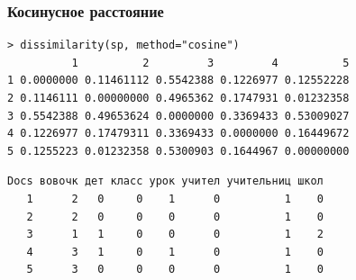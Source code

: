 \documentclass[svgnames]{beamer}
\begin{document}
\begin{frame}[fragile]
  \frametitle{Косинусное расстояние}

  \footnotesize
\begin{verbatim}
> dissimilarity(sp, method="cosine")
          1          2         3         4          5
1 0.0000000 0.11461112 0.5542388 0.1226977 0.12552228
2 0.1146111 0.00000000 0.4965362 0.1747931 0.01232358
3 0.5542388 0.49653624 0.0000000 0.3369433 0.53009027
4 0.1226977 0.17479311 0.3369433 0.0000000 0.16449672
5 0.1255223 0.01232358 0.5300903 0.1644967 0.00000000
\end{verbatim}

  \footnotesize
\begin{verbatim}
Docs вовочк дет класс урок учител учительниц школ
   1      2   0     0    1      0          1    0
   2      2   0     0    0      0          1    0
   3      1   1     0    0      0          1    2
   4      3   1     0    1      0          1    0
   5      3   0     0    0      0          1    0
\end{verbatim}

\end{frame}
\end{document}
